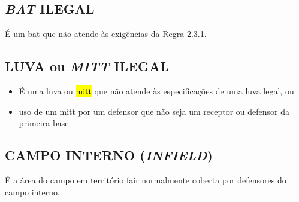\subsection{\textit{BAT} ILEGAL}
É um \gls{bat} que não atende às exigências da Regra 2.3.1.

\subsection{LUVA ou \textit{MITT} ILEGAL}
\begin{itemize}
	\item É uma luva ou \hl{mitt} que não atende às especificações de uma luva legal, ou
	\item  uso de um \gls{mitt} por um defensor que não seja um receptor ou defensor da  primeira base.
\end{itemize}



\subsection{CAMPO INTERNO (\textit{INFIELD})}

É a área do campo em território \gls{fair} normalmente coberta por defensores do campo interno.

